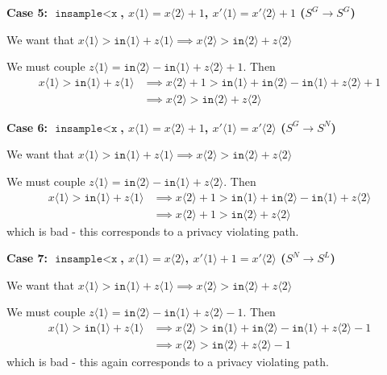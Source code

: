 \documentclass[12pt]{article}
\newcommand{\lguard}[1][x]{\texttt{insample} < \texttt{#1}}
\newcommand{\brangle}[1]{\langle #1 \rangle}
\theoremstyle{definition}
\begin{document}
\textbf{Case 5: $\lguard$, $x\brangle{1}  = x \brangle{2}+1$, $x'\langle 1 \rangle  = x' \langle 2\rangle+1$ ($S^G\to S^G$)}

We want that $x\langle 1 \rangle > \texttt{in}\langle 1\rangle + z\brangle{1}\implies x \brangle{2} > \texttt{in}\brangle{2} + z\brangle{2}$

We must couple $z\brangle{1} =\texttt{in}\brangle{2}-\texttt{in}\brangle{1} +z\brangle{2}+1$.
Then \begin{align*}
	x\langle 1 \rangle > \texttt{in}\langle 1\rangle + z\brangle{1}&\implies x\brangle{2}+1 > \texttt{in}\brangle{1} + \texttt{in}\brangle{2}-\texttt{in}\brangle{1} +z\brangle{2}+1\\
	&\implies x\brangle{2} > \texttt{in}\brangle{2} + z\brangle{2}
\end{align*}

\textbf{Case 6: $\lguard$, $x\brangle{1}  = x \brangle{2}+1$, $x'\langle 1 \rangle  = x' \langle 2\rangle$ ($S^G\to S^N$)}

We want that $x\langle 1 \rangle > \texttt{in}\langle 1\rangle + z\brangle{1}\implies x \brangle{2} > \texttt{in}\brangle{2} + z\brangle{2}$

We must couple $z\brangle{1} =\texttt{in}\brangle{2}-\texttt{in}\brangle{1} +z\brangle{2}$.
Then \begin{align*}
	x\langle 1 \rangle > \texttt{in}\langle 1\rangle + z\brangle{1}&\implies x\brangle{2}+1 > \texttt{in}\brangle{1} + \texttt{in}\brangle{2}-\texttt{in}\brangle{1} +z\brangle{2}\\
	&\implies x\brangle{2} +1 > \texttt{in}\brangle{2} + z\brangle{2}
\end{align*}
which is bad - this corresponds to a privacy violating path.


\textbf{Case 7: $\lguard$, $x\brangle{1}  = x \brangle{2}$, $x'\langle 1 \rangle +1 = x' \langle 2\rangle$ ($S^N\to S^L$)}

We want that $x\langle 1 \rangle > \texttt{in}\langle 1\rangle + z\brangle{1}\implies x \brangle{2} > \texttt{in}\brangle{2} + z\brangle{2}$

We must couple $z\brangle{1} =\texttt{in}\brangle{2}-\texttt{in}\brangle{1} +z\brangle{2}-1$.
Then \begin{align*}
	x\langle 1 \rangle > \texttt{in}\langle 1\rangle + z\brangle{1}&\implies x\brangle{2} > \texttt{in}\brangle{1} + \texttt{in}\brangle{2}-\texttt{in}\brangle{1} +z\brangle{2}-1\\
	&\implies x\brangle{2} > \texttt{in}\brangle{2} + z\brangle{2}-1
\end{align*}
which is bad - this again corresponds to a privacy violating path.
\end{document}
